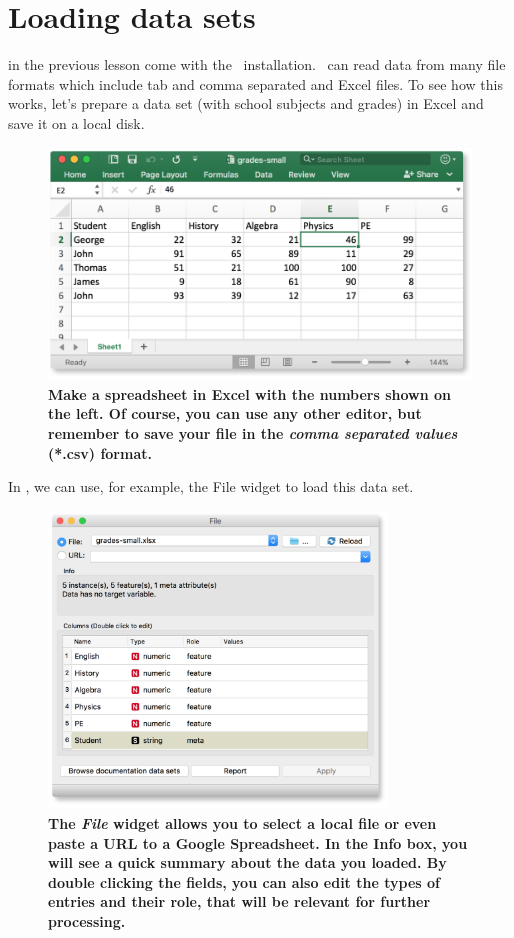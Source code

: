 \chapter{Loading data sets}
\label{ch:loading_data}

 in the previous lesson come with the \mutation\ installation. \mutation\ can read data from many file formats which include tab and comma separated and Excel files. To see how this works, let's prepare a data set (with school subjects and grades) in Excel and save it on a local disk.

\begin{figure}[h]
  \centering
  \includegraphics[width=\linewidth]{loading-fig1.png}%
  \caption{\textbf{\textsf{Make a spreadsheet in Excel with the numbers shown on the left. Of course, you can use any other editor, but remember to save your file in the \textit{comma separated values} (*.csv) format.}}}
  \label{fig:loading-fig1}
\end{figure}

In \mutation, we can use, for example, the File widget to load this data set.

\begin{figure}[h]
  \centering
  \includegraphics[width=90mm]{loading-fig2.png}%
  \caption{\textbf{\textsf{The \textit{File} widget allows you to select a local file or even paste a URL to a Google Spreadsheet. In the Info box, you will see a quick summary about the data you loaded. By double clicking the fields, you can also edit the types of entries and their role, that will be relevant for further processing.}}}
  \label{fig:loading-fig2}
\end{figure}


